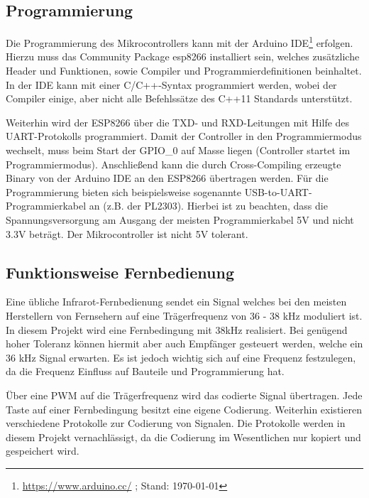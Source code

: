 \subsection{Programmierung}
Die Programmierung des Mikrocontrollers kann mit der Arduino \acs{IDE}\footnote{\url{https://www.arduino.cc/} ; Stand: \today} erfolgen. Hierzu muss das Community Package esp8266 installiert sein, welches zusätzliche Header und Funktionen, sowie Compiler und Programmierdefinitionen beinhaltet.
In der \acs{IDE} kann mit einer C/C++-Syntax programmiert werden, wobei der Compiler einige, aber nicht alle Befehlssätze des C++11 Standards unterstützt.

Weiterhin wird der ESP8266 über die \acs{TXD}- und \acs{RXD}-Leitungen mit Hilfe des \acs{UART}-Protokolls programmiert.
Damit der Controller in den Programmiermodus wechselt, muss beim Start der \acs{GPIO}\_0 auf Masse liegen (Controller startet im Programmiermodus).
Anschließend kann die durch Cross-Compiling erzeugte Binary von der Arduino IDE an den ESP8266 übertragen werden.
Für die Programmierung bieten sich beispielsweise sogenannte USB-to-\acs{UART}-Programmierkabel an (z.B. der PL2303).
Hierbei ist zu beachten, dass die Spannungsversorgung am Ausgang der meisten Programmierkabel 5V und nicht 3.3V beträgt. Der Mikrocontroller ist nicht 5V tolerant.

\subsection{Funktionsweise Fernbedienung}

Eine übliche Infrarot-Fernbedienung sendet ein Signal welches bei den meisten Herstellern von Fernsehern auf eine Trägerfrequenz von 36 - 38 kHz moduliert ist.
In diesem Projekt wird eine Fernbedingung mit 38kHz realisiert. Bei genügend hoher Toleranz können hiermit aber auch Empfänger gesteuert werden, welche ein 36 kHz Signal erwarten.
Es ist jedoch wichtig sich auf eine Frequenz festzulegen, da die Frequenz Einfluss auf Bauteile und Programmierung hat.

Über eine \ac{PWM} auf die Trägerfrequenz wird das codierte Signal übertragen.
Jede Taste auf einer Fernbedingung besitzt eine eigene Codierung.
Weiterhin existieren verschiedene Protokolle zur Codierung von Signalen.
Die Protokolle werden in diesem Projekt vernachlässigt, da die Codierung im Wesentlichen nur kopiert und gespeichert wird.


